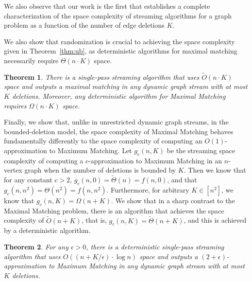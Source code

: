 \documentclass[11pt,a4paper]{article}
\newtheorem{theorem}{Theorem}
\begin{document}
We also observe that our work is the first that establishes a complete characterization of the space complexity of streaming algorithms for a graph problem as a function of the number of edge deletions $K$. 

We also show that randomization is crucial to achieving the space complexity given in Theorem~\ref{thm:ub}, as deterministic algorithms for maximal matching necessarily require $\Theta(n \cdot K)$ space. 

\begin{theorem}
\label{thm:det_maximal}
There is a single-pass streaming algorithm that uses $\tilde{O}(n \cdot K)$ space and outputs a maximal matching in any dynamic graph stream with at most $K$ deletions. Moreover, any deterministic algorithm for \textsf{Maximal Matching} requires $\Omega(n \cdot K)$ space.
\end{theorem}
\setcounter{counterDET}{\value{theorem}}


Finally, we show that, unlike in unrestricted dynamic graph streams, in the bounded-deletion model, the space complexity of \textsf{Maximal Matching} behaves fundamentally differently to the space complexity of computing an $O(1)$-approximation to \textsf{Maximum Matching}. Let $g_c(n,K)$ be the streaming space complexity of computing a $c$-approximation to \textsf{Maximum Matching} in an $n$-vertex graph when the number of deletions is bounded by $K$. Then we know that for any constant $c > 2$, $g_c(n,0) = \tilde{\Theta}(n)=f(n,0)$, and that $g_c(n,n^2) = \Theta(n^2)=f(n,n^2)$. Furthermore, for arbitrary $K \in [n^2]$, we know that $g_c(n,K) = \Omega(n+K)$. We show that in a sharp contrast to the \textsf{Maximal Matching} problem, there is an algorithm that achieves the space complexity of $\tilde{O}(n+K)$, that is, $g_c(n,K) = \tilde{\Theta}(n+K)$, and this is achieved by a deterministic algorithm.


\begin{theorem}\label{thm:ub2}
For any $\epsilon > 0$, there is a deterministic single-pass streaming algorithm that uses $O((n + K/\epsilon) \cdot \log n)$ space and outputs a $(2+\epsilon)$-approximation to \textsf{Maximum Matching} in any dynamic graph stream with at most $K$ deletions.
\end{theorem}
\setcounter{counterUB2}{\value{theorem}}


\end{document}
